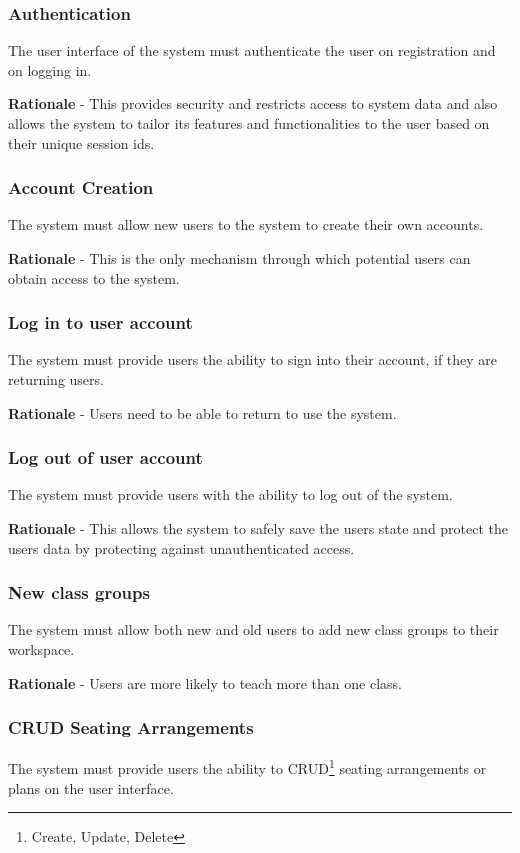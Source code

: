 \subsubsection{Authentication}
The user interface of the system must authenticate the user on registration and on logging in.

\textbf{Rationale} - This provides security and restricts access to system data and also allows the system to tailor its features and functionalities to the user based on their unique session ids.

\subsubsection{Account Creation}
The system must allow new users to the system to create their own accounts.

\textbf{Rationale} - This is the only mechanism through which potential users can obtain access to the system.

\subsubsection{Log in to user account}
The system must provide users the ability to sign into their account, if they are returning users.

\textbf{Rationale} - Users need to be able to return to use the system.

\subsubsection{Log out of user account}
The system must provide users with the ability to log out of the system.

\textbf{Rationale} - This allows the system to safely save the users state and protect the users data by protecting against unauthenticated access.

\subsubsection{New class groups}
The system must allow both new and old users to add new class groups to their workspace.

\textbf{Rationale} - Users are more likely to teach more than one class.

\subsubsection{CRUD Seating Arrangements}
The system must provide users the ability to CRUD\footnote{Create, Update, Delete} seating arrangements or plans on the user interface.

